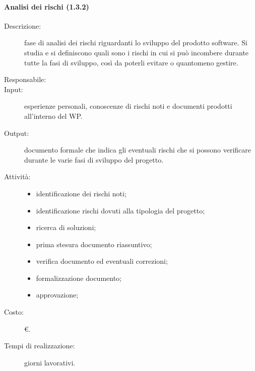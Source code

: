 \paragraph{Analisi dei rischi (1.3.2)}
\begin{description}
\item[Descrizione:] fase di analisi dei rischi riguardanti lo sviluppo del prodotto software. Si studia e si definiscono quali sono i rischi in cui si può incombere durante tutte la fasi di sviluppo, così da poterli evitare o quantomeno gestire.
\item[Responsabile:] 
\item[Input:] esperienze personali, conoscenze di rischi noti e documenti prodotti all'interno del WP.
\item[Output:] documento formale che indica gli eventuali rischi che si possono verificare durante le varie fasi di sviluppo del progetto.
\item[Attività:]
\begin{itemize}
\item identificazione dei rischi noti;
\item identificazione rischi dovuti alla tipologia del progetto;
\item ricerca di soluzioni;
\item prima stesura documento riassuntivo;
\item verifica documento ed eventuali correzioni;
\item formalizzazione documento;
\item approvazione;
\end{itemize}
\item[Costo:] \euro{}.
\item[Tempi di realizzazione:]  giorni lavorativi.
\end{description}

